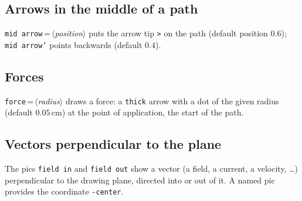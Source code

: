 \documentclass[a4paper,11pt]{article}
\newcommand\key[1]{\texttt{#1}}
\newcommand\meta[1]{\ensuremath{\langle}\textit{#1}\ensuremath{\rangle}}
\begin{document}
\subsection{Arrows in the middle of a path}
\key{mid arrow}\,=\,\meta{position} puts the arrow tip \verb|>| on the path
(default position \(0.6\)); \key{mid arrow'} points backwards (default
\(0.4\)).
\begin{example}
\end{example}

\subsection{Forces}\label{sec:forces}
\key{force}\,=\,\meta{radius} draws a force: a \key{thick} arrow with a dot
of the given radius (default \(0.05\,\mathrm{cm}\)) at the point of
application, the start of the path.
\begin{example}
\end{example}

\subsection{Vectors perpendicular to the plane}
The pics \texttt{field in} and \texttt{field out} show a vector (a field, a
current, a velocity, \ldots) perpendicular to the drawing plane, directed
into or out of it. A named pic provides the coordinate \texttt{-center}.
\begin{example}
\end{example}
\end{document}
